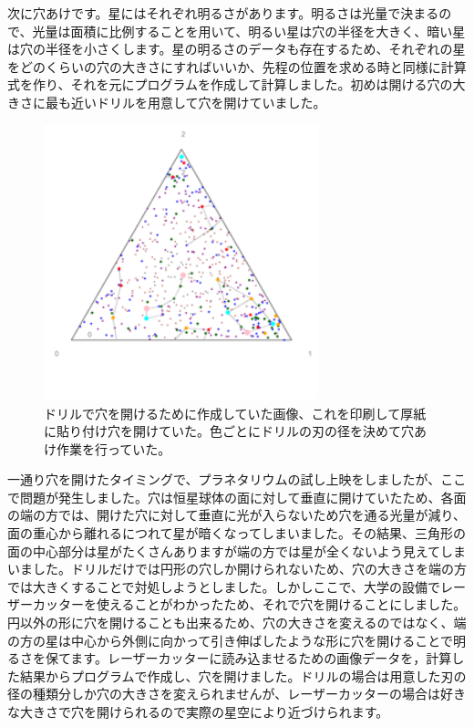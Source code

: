 \documentclass[supernova_2023]{subfiles}
\begin{document}
次に穴あけです。星にはそれぞれ明るさがあります。明るさは光量で決まるので、光量は面積に比例することを用いて、明るい星は穴の半径を大きく、暗い星は穴の半径を小さくします。星の明るさのデータも存在するため、それぞれの星をどのくらいの穴の大きさにすればいいか、先程の位置を求める時と同様に計算式を作り、それを元にプログラムを作成して計算しました。初めは開ける穴の大きさに最も近いドリルを用意して穴を開けていました。

\begin{figure}[H]
  \centering
  \includegraphics[width=8cm]{figures/Nakahara/fig2.png}
  \caption{\footnotesize ドリルで穴を開けるために作成していた画像、これを印刷して厚紙に貼り付け穴を開けていた。色ごとにドリルの刃の径を決めて穴あけ作業を行っていた。}
  \label{fig:2}
\end{figure}

一通り穴を開けたタイミングで、プラネタリウムの試し上映をしましたが、ここで問題が発生しました。穴は恒星球体の面に対して垂直に開けていたため、各面の端の方では、開けた穴に対して垂直に光が入らないため穴を通る光量が減り、面の重心から離れるにつれて星が暗くなってしまいました。その結果、三角形の面の中心部分は星がたくさんありますが端の方では星が全くないよう見えてしまいました。ドリルだけでは円形の穴しか開けられないため、穴の大きさを端の方では大きくすることで対処しようとしました。しかしここで、大学の設備でレーザーカッターを使えることがわかったため、それで穴を開けることにしました。円以外の形に穴を開けることも出来るため、穴の大きさを変えるのではなく、端の方の星は中心から外側に向かって引き伸ばしたような形に穴を開けることで明るさを保てます。レーザーカッターに読み込ませるための画像データを，計算した結果からプログラムで作成し、穴を開けました。ドリルの場合は用意した刃の径の種類分しか穴の大きさを変えられませんが、レーザーカッターの場合は好きな大きさで穴を開けられるので実際の星空により近づけられます。
\end{document}
